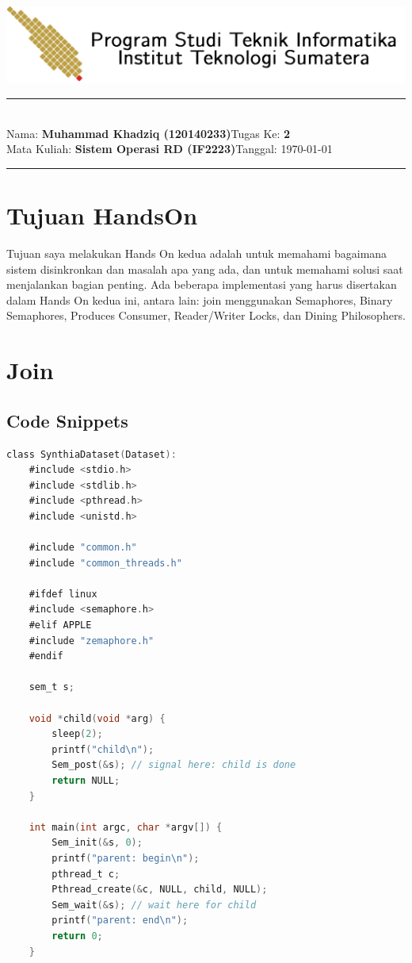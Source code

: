 \documentclass[11pt,a4paper]{article}
\newcommand{\stuid}{120140233}
\newcommand{\student}{\textbf{Muhammad Khadziq (\stuid{})}}
\newcommand{\course}{\textbf{Sistem Operasi RD (IF2223)}}
\newcommand{\assignment}{\textbf{2}} %
\begin{document}
\thispagestyle{empty}
\begin{center}
	\includegraphics[scale = 0.15]{Figure/ifitera-header.png}
	\vspace{0.1cm}
\end{center}
\noindent
{\large
\rule{17cm}{0.2cm}\\[0.3cm]
Nama: \student \hfill Tugas Ke: \assignment\\[0.1cm]
Mata Kuliah: \course \hfill Tanggal: \today\\
\rule{17cm}{0.05cm}
\vspace{0.1cm}
}


\section{Tujuan HandsOn}
    Tujuan saya melakukan Hands On  kedua adalah untuk memahami bagaimana sistem disinkronkan dan masalah apa yang ada, dan untuk memahami solusi saat menjalankan bagian penting. Ada beberapa implementasi yang harus disertakan dalam Hands On kedua ini, antara lain: join menggunakan Semaphores, Binary Semaphores, Produces Consumer, Reader/Writer Locks, dan Dining Philosophers.
    
\section{Join}
\subsection{Code Snippets}
    \begin{lstlisting}[language=C, caption=Captionnya tulis di sini class,label={labelkode}]
    class SynthiaDataset(Dataset):
    #include <stdio.h>
    #include <stdlib.h>
    #include <pthread.h>
    #include <unistd.h>

    #include "common.h"
    #include "common_threads.h"

    #ifdef linux
    #include <semaphore.h>
    #elif APPLE
    #include "zemaphore.h"
    #endif

    sem_t s;

    void *child(void *arg) {
        sleep(2);
        printf("child\n");
        Sem_post(&s); // signal here: child is done
        return NULL;
    }

    int main(int argc, char *argv[]) {
        Sem_init(&s, 0); 
        printf("parent: begin\n");
        pthread_t c;
        Pthread_create(&c, NULL, child, NULL);
        Sem_wait(&s); // wait here for child
        printf("parent: end\n");
        return 0;
    }
    \end{lstlisting}
\end{document}
